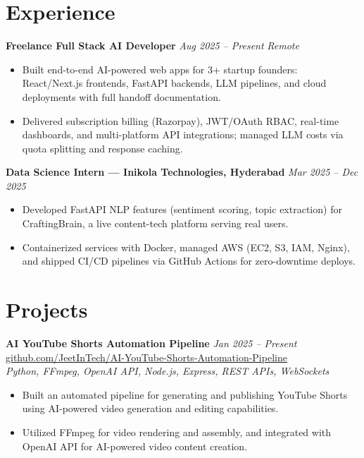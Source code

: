 \documentclass[9.5pt]{article}
\begin{document}
\section*{Experience}

\textbf{Freelance Full Stack AI Developer} \hfill \textit{Aug 2025 -- Present} \quad \textit{Remote}
\begin{itemize}
  \item Built end-to-end AI-powered web apps for 3+ startup founders: React/Next.js frontends, FastAPI backends, LLM pipelines, and cloud deployments with full handoff documentation.
  \item Delivered subscription billing (Razorpay), JWT/OAuth RBAC, real-time dashboards, and multi-platform API integrations; managed LLM costs via quota splitting and response caching.
\end{itemize}

\vspace{1.5pt}
\textbf{Data Science Intern --- Inikola Technologies, Hyderabad} \hfill \textit{Mar 2025 -- Dec 2025}
\begin{itemize}
  \item Developed FastAPI NLP features (sentiment scoring, topic extraction) for CraftingBrain, a live content-tech platform serving real users.
  \item Containerized services with Docker, managed AWS (EC2, S3, IAM, Nginx), and shipped CI/CD pipelines via GitHub Actions for zero-downtime deploys.
\end{itemize}

\section*{Projects}

\textbf{AI YouTube Shorts Automation Pipeline} \hfill \textit{Jan 2025 -- Present} \quad \href{https://github.com/JeetInTech/AI-YouTube-Shorts-Automation-Pipeline}{github.com/JeetInTech/AI-YouTube-Shorts-Automation-Pipeline}\\
\textit{Python, FFmpeg, OpenAI API, Node.js, Express, REST APIs, WebSockets}
\begin{itemize}
  \item Built an automated pipeline for generating and publishing YouTube Shorts using AI-powered video generation and editing capabilities.
  \item Utilized FFmpeg for video rendering and assembly, and integrated with OpenAI API for AI-powered video content creation.
\end{itemize}
\end{document}
